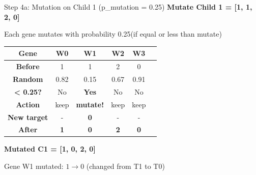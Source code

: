 \documentclass[aspectratio=169,10pt]{beamer}
\begin{document}
\begin{frame}{Step 4a: Mutation on Child 1 (p\_mutation = 0.25)}
  \colorbox{navymid}{\color{teallt}\bfseries Mutate Child 1 = [1, 1, 2, 0]}
  
  \vspace{0.3cm}
   {\small Each gene mutates with probability 0.25(if equal or less than mutate)}

  \vspace{0.3cm}
  \centering
  \begin{tabular}{cccccc}
    \toprule
    \rowcolor{navymid}
    \color{white}\textbf{Gene} & \color{white}\textbf{W0} & \color{white}\textbf{W1} & \color{white}\textbf{W2} & \color{white}\textbf{W3} \\
    \midrule
    \textbf{Before} & 1 & 1 & 2 & 0 \\
    \midrule
    \textbf{Random} & 0.82 & 0.15 & 0.67 & 0.91 \\
    \textbf{< 0.25?} & No & \cellcolor{amber}\textbf{Yes} & No & No \\
    \midrule
    \textbf{Action} & keep & \cellcolor{amber}\textbf{mutate!} & keep & keep \\
    \textbf{New target} & - & \cellcolor{amber}\textbf{0} & - & - \\
    \midrule
    \rowcolor{lightgreen}
    \cellcolor{mygreen}\color{white}\textbf{After} & \textbf{1} & \cellcolor{amber}\color{white}\textbf{0} & \textbf{2} & \textbf{0} \\
    \bottomrule
  \end{tabular}
  
  \vspace{0.3cm}
  \colorbox{mygreen}{\color{white}\bfseries Mutated C1 = [1, 0, 2, 0]}
  
  \vspace{0.2cm}
  {\small Gene W1 mutated: $1 \to 0$ (changed from T1 to T0)}
\end{frame}
\end{document}

